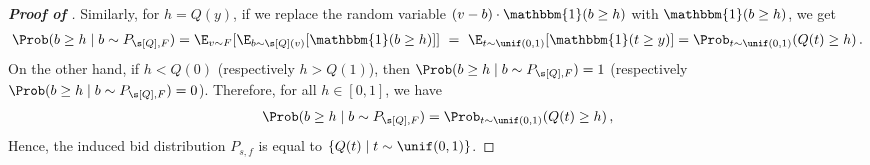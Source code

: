 \begin{proof}[\textbf{Proof of }]
    Similarly, for $h = Q(y)$, if we replace the random variable $(v - b) \cdot \mathbbm{1}(b \geq h)$ with $\mathbbm{1}(b \geq h)$, we get
    \begin{align*}
        \Prob(b \geq h\mid b \sim P_{\s[Q],F}) = \E_{v \sim F}[ \E_{b \sim \s[Q](v)} [\mathbbm{1}(b \geq h)]]\ =\ \E_{t \sim \unif(0,1)}[\mathbbm{1}(t \geq y)] = \Prob_{t \sim \unif(0,1)}(Q(t) \geq h) \,.
    \end{align*}
    On the other hand, if $h < Q(0)$ (respectively $h > Q(1)$), then $\Prob(b \geq h\mid b \sim P_{\s[Q],F}) = 1$ (respectively $\Prob(b \geq h\mid b \sim P_{\s[Q],F}) = 0$). Therefore, for all $h \in [0,1]$, we have
    \begin{align*}
        \Prob(b \geq h\mid b \sim P_{\s[Q],F}) = \Prob_{t \sim \unif(0,1)}(Q(t) \geq h)\,,
    \end{align*}
    Hence, the induced bid distribution $P_{s,f}$ is equal to $\{Q(t)\mid t \sim \unif(0,1)\}$.
\end{proof}


